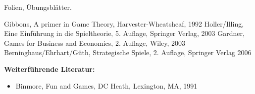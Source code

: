 \begin{course}
\begin{content}
\end{content}

\begin{media}Folien, Übungsblätter.

\end{media}

\begin{literature}Gibbons, A primer in Game Theory, Harvester-Wheatsheaf, 1992\newline
Holler/Illing, Eine Einführung in die Spieltheorie, 5. Auflage, Springer Verlag, 2003 \newline
Gardner, Games for Business and Economics, 2. Auflage, Wiley, 2003 \newline
Berninghaus/Ehrhart/Güth, Strategische Spiele, 2. Auflage, Springer Verlag 2006

 

\textbf{Weiterführende Literatur:}

 \begin{itemize}\item Binmore, Fun and Games, DC Heath, Lexington, MA, 1991  \end{itemize}\end{literature}



\end{course}